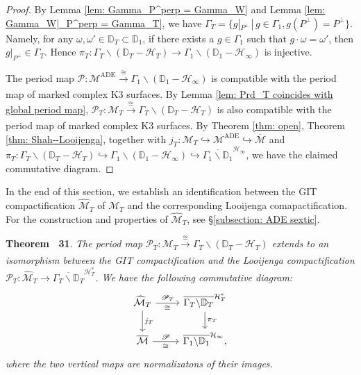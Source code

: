 \documentclass[
]{article}
\begin{document}
\emph{Proof.} By Lemma \ref{lem: Gamma_P^perp = Gamma_W} and Lemma
\ref{lem: Gamma_W|_P^perp = Gamma_T}, we have
\(\Gamma_T = \{ g|_{P^\perp} \,|\, g\in\Gamma_1, g(P^\perp)=P^\perp \}\).
Namely, for any \(\omega,\omega'\in\mathbb{D}_T\subset\mathbb{D}_1\), if
there exists a \(g\in\Gamma_1\) such that \(g\cdot\omega=\omega'\), then
\(g|_{P^\perp}\in\Gamma_T\). Hence
\(\pi_T\colon\Gamma_T\backslash(\mathbb{D}_T-\mathcal{H}_T)\to\Gamma_1\backslash(\mathbb{D}_1-\mathcal{H}_\infty)\)
is injective.

The period map
\(\mathscr{P}\colon\mathcal{M}^{\mathrm{ADE}}\xrightarrow[]{\cong}\Gamma_1\backslash(\mathbb{D}_1-\mathcal{H}_\infty)\)
is compatible with the period map of marked complex K3 surfaces. By
Lemma \ref{lem: Prd_T coincides with global period map},
\(\mathscr{P}_T\colon\mathcal{M}_T\xrightarrow[]{\cong}\Gamma_T\backslash(\mathbb{D}_T-\mathcal{H}_T)\)
is also compatible with the period map of marked complex K3 surfaces. By
Theorem \ref{thm: open}, Theorem \ref{thm: Shah--Looijenga}, together
with
\(j_T\colon \mathcal{M}_T\hookrightarrow\mathcal{M}^{\mathrm{ADE}}\hookrightarrow\overline{\mathcal{M}}\)
and
\(\pi_T\colon \Gamma_T\backslash(\mathbb{D}_T-\mathcal{H}_T)\hookrightarrow\Gamma_1\backslash(\mathbb{D}_1-\mathcal{H}_\infty)\hookrightarrow\overline{\Gamma_1\backslash\mathbb{D}_1}^{\mathcal{H}_\infty}\),
we have the claimed commutative diagram.~◻

In the end of this section, we establish an identification between the
GIT compactification \(\widehat{\mathcal{M}}_T\) of \(\mathcal{M}_T\)
and the corresponding Looijenga comapactification. For the construction
and properties of \(\widehat{\mathcal{M}}_T\), see
§\ref{subsection: ADE sextic}.

\textbf{Theorem~ 31}. \emph{\label{thm: comm diag, compact to compact}
The period map
\(\mathscr{P}_T\colon\mathcal{M}_T\xrightarrow[]{\cong}\Gamma_T\backslash(\mathbb{D}_T-\mathcal{H}_T)\)
extends to an isomorphism between the GIT compactification and the
Looijenga compactification
\(\mathscr{P}_T\colon \widehat{\mathcal{M}}_T\to\overline{\Gamma_T\backslash\mathbb{D}_T}^{\mathcal{H}_T^*}\).
We have the following commutative diagram: \[\begin{tikzcd}
      \widehat{\mathcal{M}}_T \arrow[r,"\mathscr{P}_T","\cong"'] \arrow[d,"j_T"] & \overline{\Gamma_T\backslash\mathbb{D}_T}^{\mathcal{H}_T^*} \arrow[d,"\pi_T"] \\
      \overline{\mathcal{M}} \arrow[r,"\mathscr{P}","\cong"'] & \overline{\Gamma_1\backslash\mathbb{D}_1}^{\mathcal{H}_\infty},
    \end{tikzcd}\] where the two vertical maps are normalizatons of
their images.}
\end{document}

